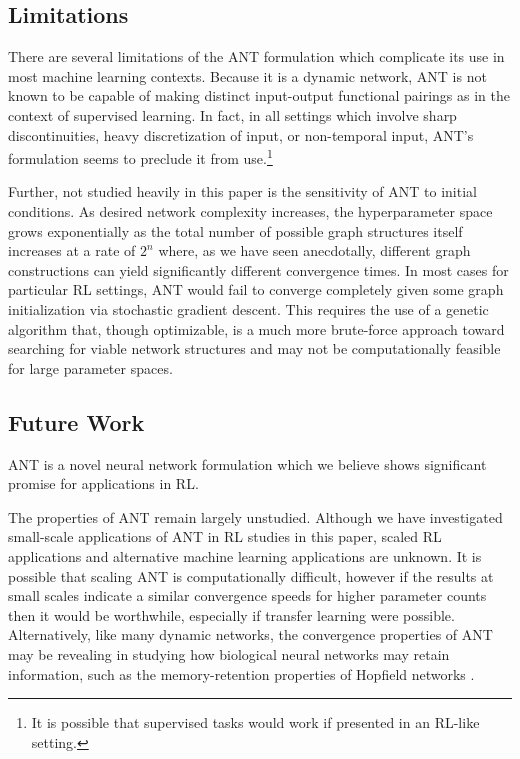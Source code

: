\documentclass{article}
\begin{document}
\begin{multicols}{2}
	\subsection{Limitations}
	
	There are several limitations of the ANT formulation which complicate its use in most machine learning contexts. Because it is a dynamic network, ANT is not known to be capable of making distinct input-output functional pairings as in the context of supervised learning. In fact, in all settings which involve sharp discontinuities, heavy discretization of input, or non-temporal input, ANT's formulation seems to preclude it from use.\footnote{It is possible that supervised tasks would work if presented in an RL-like setting.}
	
	Further, not studied heavily in this paper is the sensitivity of ANT to initial conditions. As desired network complexity increases, the hyperparameter space grows exponentially as the total number of possible graph structures itself increases at a rate of $2^n$ where, as we have seen anecdotally, different graph constructions can yield significantly different convergence times. In most cases for particular RL settings, ANT would fail to converge completely given some graph initialization via stochastic gradient descent. This requires the use of a genetic algorithm that, though optimizable, is a much more brute-force approach toward searching for viable network structures and may not be computationally feasible for large parameter spaces.
	
	\subsection{Future Work}
	ANT is a novel neural network formulation which we believe shows significant promise for applications in RL.
	
	The properties of ANT remain largely unstudied. Although we have investigated small-scale applications of ANT in RL studies in this paper, scaled RL applications and alternative machine learning applications are unknown. It is possible that scaling ANT is computationally difficult, however if the results at small scales indicate a similar convergence speeds for higher parameter counts then it would be worthwhile, especially if transfer learning were possible. Alternatively, like many dynamic networks, the convergence properties of ANT may be revealing in studying how biological neural networks may retain information, such as the memory-retention properties of Hopfield networks \cite{hopfield1977}.
	

\end{multicols}
\end{document}
